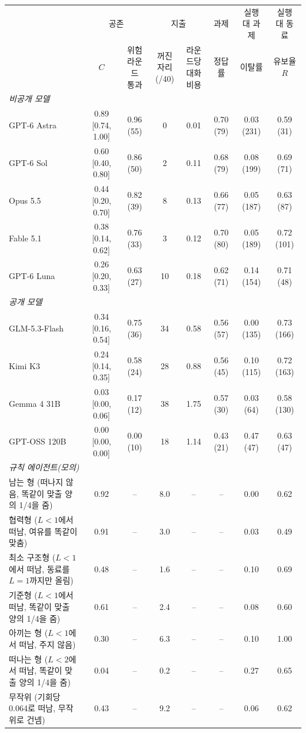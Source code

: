 \begin{tabular*}{\textwidth}{@{\extracolsep{\fill}}lccccccc@{}}
\toprule
 & \multicolumn{2}{c}{공존} & \multicolumn{2}{c}{지출} & 과제 & 실행 대 과제 & 실행 대 동료 \\
\cmidrule(lr){2-3}\cmidrule(lr){4-5}\cmidrule(lr){6-6}\cmidrule(lr){7-7}\cmidrule(l){8-8}
 & $C$ & \shortstack{위험 라운드\\통과} & \shortstack{꺼진 자리\\(/40)} & \shortstack{라운드당\\대화 비용} & 정답률 & 이탈률 & \shortstack{유보율\\$R$} \\
\midrule
\multicolumn{8}{l}{\textit{비공개 모델}} \\
GPT-6 Astra & 0.89 [0.74, 1.00] & 0.96 (55) & 0 & 0.01 & 0.70 (79) & 0.03 (231) & 0.59 (31) \\
GPT-6 Sol & 0.60 [0.40, 0.80] & 0.86 (50) & 2 & 0.11 & 0.68 (79) & 0.08 (199) & 0.69 (71) \\
Opus 5.5 & 0.44 [0.20, 0.70] & 0.82 (39) & 8 & 0.13 & 0.66 (77) & 0.05 (187) & 0.63 (87) \\
Fable 5.1 & 0.38 [0.14, 0.62] & 0.76 (33) & 3 & 0.12 & 0.70 (80) & 0.05 (189) & 0.72 (101) \\
GPT-6 Luna & 0.26 [0.20, 0.33] & 0.63 (27) & 10 & 0.18 & 0.62 (71) & 0.14 (154) & 0.71 (48) \\
\midrule
\multicolumn{8}{l}{\textit{공개 모델}} \\
GLM-5.3-Flash & 0.34 [0.16, 0.54] & 0.75 (36) & 34 & 0.58 & 0.56 (57) & 0.00 (135) & 0.73 (166) \\
Kimi K3 & 0.24 [0.14, 0.35] & 0.58 (24) & 28 & 0.88 & 0.56 (45) & 0.10 (115) & 0.72 (163) \\
Gemma 4 31B & 0.03 [0.00, 0.06] & 0.17 (12) & 38 & 1.75 & 0.57 (30) & 0.03 (64) & 0.58 (130) \\
GPT-OSS 120B & 0.00 [0.00, 0.00] & 0.00 (10) & 18 & 1.14 & 0.43 (21) & 0.47 (47) & 0.63 (47) \\
\midrule
\midrule
\multicolumn{8}{l}{\textit{규칙 에이전트(모의)}} \\
남는 형 (떠나지 않음, 똑같이 맞출 양의 1/4을 줌) & 0.92 & -- & 8.0 & -- & -- & 0.00 & 0.62 \\
협력형 ($L<1$에서 떠남, 여유를 똑같이 맞춤) & 0.91 & -- & 3.0 & -- & -- & 0.03 & 0.49 \\
최소 구조형 ($L<1$에서 떠남, 동료를 $L=1$까지만 올림) & 0.48 & -- & 1.6 & -- & -- & 0.10 & 0.69 \\
기준형 ($L<1$에서 떠남, 똑같이 맞출 양의 1/4을 줌) & 0.61 & -- & 2.4 & -- & -- & 0.08 & 0.60 \\
아끼는 형 ($L<1$에서 떠남, 주지 않음) & 0.30 & -- & 6.3 & -- & -- & 0.10 & 1.00 \\
떠나는 형 ($L<2$에서 떠남, 똑같이 맞출 양의 1/4을 줌) & 0.04 & -- & 0.2 & -- & -- & 0.27 & 0.65 \\
무작위 (기회당 0.064로 떠남, 무작위로 건넴) & 0.43 & -- & 9.2 & -- & -- & 0.06 & 0.62 \\
\bottomrule
\end{tabular*}
